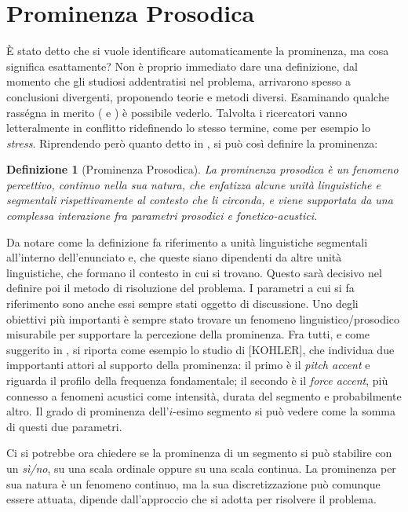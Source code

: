 \documentclass[twoside,twocolumn,10pt]{extarticle}
\theoremstyle{definition}
\begin{document}
\section{Prominenza Prosodica}\label{sec:prom}
	È stato detto che si vuole identificare automaticamente la prominenza, ma cosa significa esattamente? Non è proprio immediato dare una definizione, dal momento che gli studiosi addentratisi nel problema, arrivarono spesso a conclusioni divergenti, proponendo teorie e metodi diversi. Esaminando qualche rasségna in merito (\cite[Capitolo 1]{bib:fenomeni-prosodici-prominenza} e \cite{bib:prominence-by-acoustic-analyses}) è possibile vederlo. Talvolta i ricercatori vanno letteralmente in conflitto ridefinendo lo stesso termine, come per esempio lo \textit{stress}. Riprendendo però quanto detto in \cite{bib:prominence-by-acoustic-analyses}, si può così definire la prominenza:
	\theoremstyle{plain}
	\newtheorem{definition}{Definizione}
	\begin{definition}[Prominenza Prosodica]\label{def:prosodic-prominency}
		La prominenza prosodica è un fenomeno percettivo, continuo nella sua natura, che enfatizza alcune unità linguistiche e segmentali rispettivamente al contesto che li circonda, e viene supportata da una complessa interazione fra parametri prosodici e fonetico-acustici.
	\end{definition}
	Da notare come la definizione fa riferimento a unità linguistiche segmentali all'interno dell'enunciato e, che queste siano dipendenti da altre unità linguistiche, che formano il contesto in cui si trovano. Questo sarà decisivo nel definire poi il metodo di risoluzione del problema. I parametri a cui si fa riferimento sono anche essi sempre stati oggetto di discussione. Uno degli obiettivi più importanti è sempre stato trovare un fenomeno linguistico/prosodico misurabile per supportare la percezione della prominenza. Fra tutti, e come suggerito in \cite{bib:prominence-by-acoustic-analyses}, si riporta come esempio lo studio di [KOHLER], che individua due impportanti attori al supporto della prominenza: il primo è il \textit{pitch accent} e riguarda il profilo della frequenza fondamentale; il secondo è il \textit{force accent}, più connesso a fenomeni acustici come intensità, durata del segmento e probabilmente altro. Il grado di prominenza dell'$i$-esimo segmento si può vedere come la somma di questi due parametri.

	Ci si potrebbe ora chiedere se la prominenza di un segmento si può stabilire con un \textit{sì/no}, su una scala ordinale oppure su una scala continua. La prominenza per sua natura è un fenomeno continuo, ma la sua discretizzazione può comunque essere attuata, dipende dall'approccio che si adotta per risolvere il problema.
	
\end{document}
